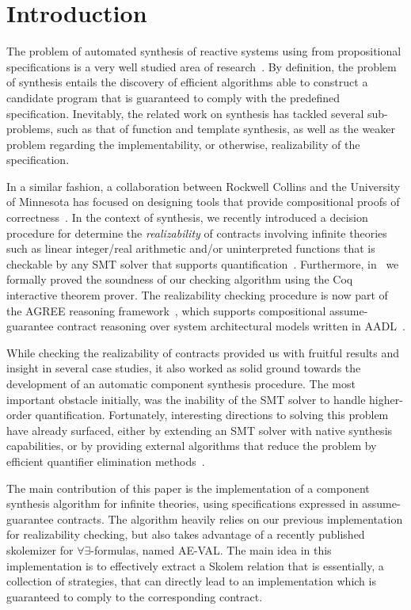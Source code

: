\section{Introduction}
The problem of automated synthesis of reactive systems using from propositional specifications is a very well studied area of research~\cite{gulwani2010dimensions}. By definition, the problem of synthesis entails the discovery of efficient algorithms able to construct a candidate program that is guaranteed to comply with the predefined specification. Inevitably, the related work on synthesis has tackled several sub-problems, such as that of function and template synthesis, as well as the weaker problem regarding the implementability, or otherwise, realizability of the specification.

In a similar fashion, a collaboration between Rockwell Collins and
the University of Minnesota has focused on designing tools that provide
compositional proofs of correctness~\cite{NFM2012:CoGaMiWhLaLu,Whalen13:WhatHow:TwinPeaksIEEESoftware,hilt2013,QFCS15:backes}.
In the context of synthesis, we recently introduced a decision procedure for determine the {\em realizability} of contracts involving infinite theories such as linear integer/real arithmetic and/or uninterpreted functions that is checkable by any SMT solver that supports quantification~\cite{Katis15:Realizability}. Furthermore, in~\cite{Katis:machine} we formally proved the soundness of our checking algorithm using the Coq interactive theorem prover. The realizability checking procedure is now part of the AGREE reasoning framework~\cite{NFM2012:CoGaMiWhLaLu}, which supports compositional
assume-guarantee contract reasoning over system architectural models written in
AADL~\cite{SAE:AADL}.

While checking the realizability of contracts provided us with fruitful results
and insight in several case studies, it also worked as solid ground towards the
development of an automatic component synthesis procedure. The
most important obstacle initially, was the inability of the SMT solver to
handle higher-order quantification. Fortunately, interesting directions to
solving this problem have already surfaced, either by extending an SMT solver
with native synthesis capabilities\cite{reynoldscounterexample}, or by providing
external algorithms that reduce the problem by efficient quantifier elimination methods~\cite{fedyukovichae}.

The main contribution of this paper is the implementation of a
component synthesis algorithm for infinite theories, using specifications
expressed in assume-guarantee contracts.  The algorithm heavily relies on our previous implementation for realizability checking, but also takes advantage of a recently published skolemizer for $\forall\exists$-formulas, named
AE-VAL. The main idea in this implementation is to effectively extract a Skolem
relation that is essentially, a collection of strategies, that can directly lead to an implementation which is guaranteed to comply to the corresponding contract.

